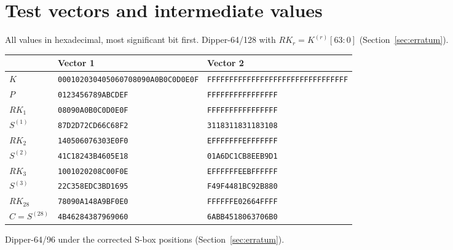 \documentclass[11pt,a4paper]{article}
\theoremstyle{definition}
\theoremstyle{remark}
\begin{document}
\appendix
\section{Test vectors and intermediate values}\label{app:tv}
All values in hexadecimal, most significant bit first. Dipper-64/128 with $RK_r=K^{(r)}[63{:}0]$ (Section~\ref{sec:erratum}).

\begin{center}\small
\begin{tabular}{lll}
\toprule
 & Vector 1 & Vector 2\\
\midrule
$K$ & \texttt{000102030405060708090A0B0C0D0E0F} & \texttt{FFFFFFFFFFFFFFFFFFFFFFFFFFFFFFFF}\\
$P$ & \texttt{0123456789ABCDEF} & \texttt{FFFFFFFFFFFFFFFF}\\
$RK_1$ & \texttt{08090A0B0C0D0E0F} & \texttt{FFFFFFFFFFFFFFFF}\\
$S^{(1)}$ & \texttt{87D2D72CD66C68F2} & \texttt{3118311831183108}\\
$RK_2$ & \texttt{140506076303E0F0} & \texttt{EFFFFFFFEFFFFFFF}\\
$S^{(2)}$ & \texttt{41C18243B4605E18} & \texttt{01A6DC1CB8EEB9D1}\\
$RK_3$ & \texttt{1001020208C00F0E} & \texttt{EFFFFFFEEBFFFFFF}\\
$S^{(3)}$ & \texttt{22C358EDC3BD1695} & \texttt{F49F4481BC92B880}\\
$RK_{28}$ & \texttt{78090A148A9BF0E0} & \texttt{FFFFFFE02664FFFF}\\
$C=S^{(28)}$ & \texttt{4B46284387969060} & \texttt{6ABB4518063706B0}\\
\bottomrule
\end{tabular}
\end{center}

\medskip\noindent Dipper-64/96 under the corrected S-box positions (Section~\ref{sec:erratum}).
\end{document}
